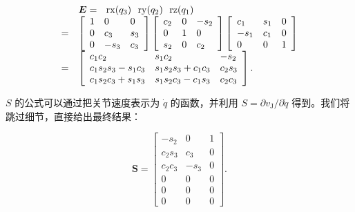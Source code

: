 \documentclass[10pt,a4paper]{book}
\theoremstyle{thmstyle} %
\theoremstyle{defstyle} %
\theoremstyle{prostyle} %
\begin{document}
$$
\begin{array}{rl} & { \boldsymbol { E } = \mathrm { \boldmath ~ \ r x } ( q _ { 3 } ) \mathrm { \boldmath ~ \ r y } ( q _ { 2 } ) \mathrm { \boldmath ~ \ r z } ( q _ { 1 } ) } \\{ = } & { \left[ \begin{array}{lll} { 1 } & { 0 } & { 0 } \\ { 0 } & { c _ { 3 } } & { s _ { 3 } } \\ { 0 } & { - s _ { 3 } } & { c _ { 3 } } \end{array} \right] \left[ \begin{array}{lll} { c _ { 2 } } & { 0 } & { - s _ { 2 } } \\ { 0 } & { 1 } & { 0 } \\ { s _ { 2 } } & { 0 } & { c _ { 2 } } \end{array} \right] \left[ \begin{array}{lll} { c _ { 1 } } & { s _ { 1 } } & { 0 } \\ { - s _ { 1 } } & { c _ { 1 } } & { 0 } \\ { 0 } & { 0 } & { 1 } \end{array} \right] } \\{ = } & { \left[ \begin{array}{lll} { c _ { 1 } c _ { 2 } } & { s _ { 1 } c _ { 2 } } & { - s _ { 2 } } \\ { c _ { 1 } s _ { 2 } s _ { 3 } - s _ { 1 } c _ { 3 } } & { s _ { 1 } s _ { 2 } s _ { 3 } + c _ { 1 } c _ { 3 } } & { c _ { 2 } s _ { 3 } } \\ { c _ { 1 } s _ { 2 } c _ { 3 } + s _ { 1 } s _ { 3 } } & { s _ { 1 } s _ { 2 } c _ { 3 } - c _ { 1 } s _ { 3 } } & { c _ { 2 } c _ { 3 } } \end{array} \right] . } \end{array}
$$



$S$ 的公式可以通过把关节速度表示为 $\dot{q}$ 的函数，并利用 $S = \partial v_{\mathrm{J}}/\partial \dot{q}$ 得到。我们将跳过细节，直接给出最终结果：



$$
{ \boldsymbol { S } } = { \left[ \begin{array}{lll} { - s _ { 2 } } & { 0 } & { 1 } \\ { c _ { 2 } s _ { 3 } } & { c _ { 3 } } & { 0 } \\ { c _ { 2 } c _ { 3 } } & { - s _ { 3 } } & { 0 } \\ { 0 } & { 0 } & { 0 } \\ { 0 } & { 0 } & { 0 } \\ { 0 } & { 0 } & { 0 } \end{array} \right] } .
$$
\end{document}
